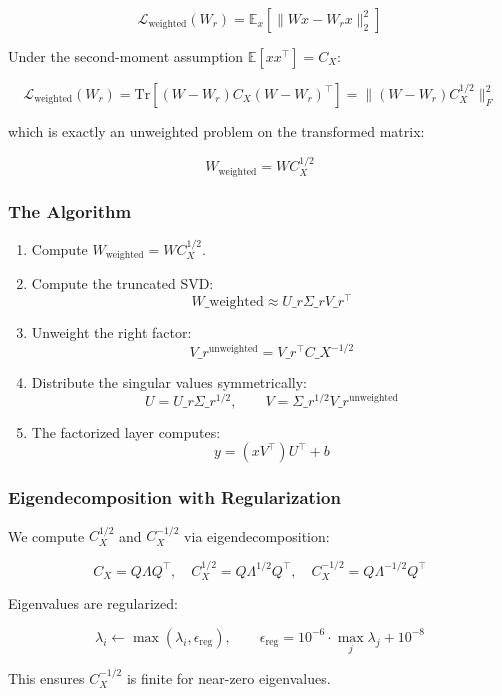 \[
\mathcal{L}_\text{weighted}(W_r) = \mathbb{E}_{x}\!\left[\|W x - W_r x\|_2^2\right]
\tag{4.5}
\]

Under the second-moment assumption $\mathbb{E}[x x^\top] = C_X$:

\[
\mathcal{L}_\text{weighted}(W_r) = \mathrm{Tr}\!\left[(W - W_r) C_X (W - W_r)^\top\right] = \|(W - W_r) C_X^{1/2}\|_F^2
\tag{4.6}
\]

which is exactly an unweighted problem on the transformed matrix:

\[
W_\text{weighted} = W C_X^{1/2}
\tag{4.7}
\]

\subsubsection{The Algorithm}

\begin{enumerate}
\item Compute $W_\text{weighted} = W C_X^{1/2}$.
\item Compute the truncated SVD:
  $$
  W\_\text{weighted} \approx U\_r \Sigma\_r V\_r^\top
  \tag{4.8}
  $$
\item Unweight the right factor:
  $$
  V\_r^\text{unweighted} = V\_r^\top C\_X^{-1/2}
  \tag{4.9}
  $$
\item Distribute the singular values symmetrically:
  $$
  U = U\_r \Sigma\_r^{1/2}, \qquad
  V = \Sigma\_r^{1/2} V\_r^\text{unweighted}
  \tag{4.10}
  $$
\item The factorized layer computes:
  $$
  y = (x V^\top) U^\top + b
  \tag{4.11}
  $$

\end{enumerate}
\subsubsection{Eigendecomposition with Regularization}

We compute $C_X^{1/2}$ and $C_X^{-1/2}$ via eigendecomposition:

\[
C_X = Q \Lambda Q^\top, \quad
C_X^{1/2} = Q \Lambda^{1/2} Q^\top, \quad
C_X^{-1/2} = Q \Lambda^{-1/2} Q^\top
\tag{4.12}
\]

Eigenvalues are regularized:

\[
\lambda_i \leftarrow \max(\lambda_i, \epsilon_\text{reg}), \qquad
\epsilon_\text{reg} = 10^{-6} \cdot \max_j \lambda_j + 10^{-8}
\tag{4.13}
\]

This ensures $C_X^{-1/2}$ is finite for near-zero eigenvalues.

